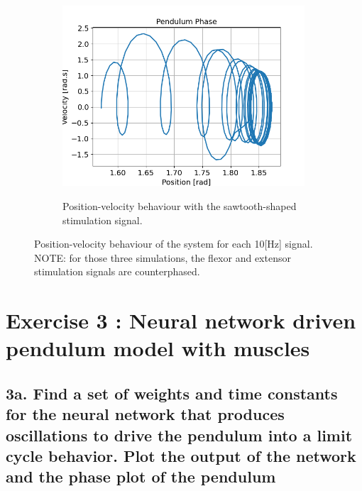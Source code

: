 \documentclass{cmc}
\begin{document}
\begin{figure}[H]
  \begin{subfigure}[b]{0.48\textwidth}
    { \centering
      \includegraphics[width=0.99\textwidth]{figures/2b_sawtooth_10HZ_counterphased.png} }
    \caption{Position-velocity behaviour with the sawtooth-shaped stimulation signal.}
    \label{fig:2c_square_signal}
  \end{subfigure}

  \caption{Position-velocity behaviour of the system for each 10[Hz] signal. NOTE: for those three simulations, the flexor and extensor stimulation signals are counterphased.}
  \label{fig:2c_signals}
\end{figure}


\newpage
\section*{Exercise 3 : Neural network driven pendulum model with
  muscles}
\label{sec:neur-netw-driv}


\subsection*{3a. Find a set of weights and time constants for the
  neural network that produces oscillations to drive the pendulum into
  a limit cycle behavior. Plot the output of the network and the phase
  plot of the pendulum}
\label{sec:4a}

\end{document}
